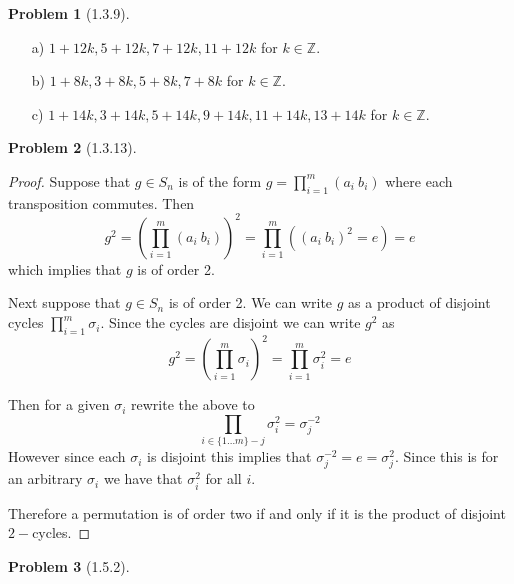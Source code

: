 \documentclass[10pt]{article}
\newcommand{\sk}{\vskip 10mm}
\newcommand{\bb}[1]{\mathbb{#1}}
\theoremstyle{plain}
\newtheorem{problem}{Problem}
\theoremstyle{remark}
\begin{document}
\sk

\begin{problem}[1.3.9] 
  
\end{problem}

\begin{itemize}
\item[a)] $1+12k,5+12k,7+12k,11+12k$ for $k\in\bb{Z}$.
\item[b)] $1+8k,3+8k,5+8k,7+8k$ for $k\in\bb{Z}$.
\item[c)] $1+14k,3+14k,5+14k,9+14k,11+14k,13+14k$ for $k\in\bb{Z}$.
\end{itemize}

\sk

\begin{problem}[1.3.13] 
  
\end{problem}

\begin{proof}
  Suppose that $g\in S_n$ is of the form $g=\prod_{i=1}^m(a_i\ b_i)$
  where each transposition commutes. Then
  \[ g^2 = \left(\prod_{i=1}^m(a_i\ b_i)\right)^2=
    \prod_{i=1}^m((a_i\ b_i)^2=e)=e \]
  which implies that $g$ is of order 2.

  Next suppose that $g\in S_n$ is of order 2. We can write $g$
  as a product of disjoint cycles $\prod_{i=1}^m\sigma_i$. Since
  the cycles are disjoint we can write $g^2$ as
  \[ g^2=\left(\prod_{i=1}^m\sigma_i\right)^2=\prod_{i=1}^m\sigma_i^2=e \]

  Then for a given $\sigma_i$ rewrite the above to
  \[ \prod_{i\in\{1\ldots m\}-j}\sigma_i^2 = \sigma_j^{-2} \]
  However since each $\sigma_i$ is disjoint this implies that
  $\sigma_j^{-2}=e=\sigma_j^2$. Since this is for an arbitrary
  $\sigma_i$ we have that $\sigma_i^2$ for all $i$.

  Therefore a permutation is of order two if and only if
  it is the product of disjoint $2-$cycles.
\end{proof}

\sk

\begin{problem}[1.5.2] 
  
\end{problem}
\end{document}
